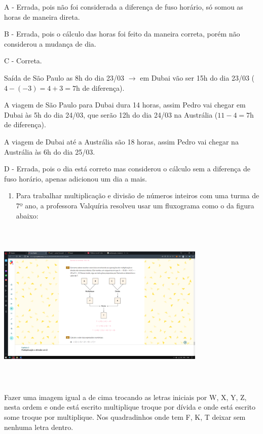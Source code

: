 {{A - Errada, pois não foi considerada a diferença de fuso horário, só
somou as horas de maneira direta.

B - Errada, pois o cálculo das horas foi feito da maneira correta, porém
não considerou a mudança de dia.

C - Correta.

Saída de São Paulo as 8h do dia 23/03 \(\rightarrow\) em Dubai vão ser
15h do dia 23/03 (\(4 - ( - 3) = 4 + 3 = 7\text{h\ }\)de diferença).

A viagem de São Paulo para Dubai dura 14 horas, assim Pedro vai chegar
em Dubai às 5h do dia 24/03, que serão 12h do dia 24/03 na Austrália
(\(11 - 4 = 7\text{h\ }\)de diferença).

A viagem de Dubai até a Austrália são 18 horas, assim Pedro vai chegar
na Austrália às 6h do dia 25/03.

D - Errada, pois o dia está correto mas considerou o cálculo sem a
diferença de fuso horário, apenas adicionou um dia a mais.

\begin{enumerate}
\def\labelenumi{\arabic{enumi})}
\setcounter{enumi}{1}
\tightlist
\item
  Para trabalhar multiplicação e divisão de números inteiros com uma
  turma de 7º ano, a professora Valquíria resolveu usar um fluxograma
  como o da figura abaixo:
\end{enumerate}

\includegraphics[width=3.92296in,height=3.18898in]{./imgSAEB_7_MAT/media/image3.png}

Fazer uma imagem igual a de cima trocando as letras iniciais por W, X,
Y, Z, nesta ordem e onde está escrito multiplique troque por dívida e
onde está escrito some troque por multiplique. Nos quadradinhos onde tem
F, K, T deixar sem nenhuma letra dentro.

}}
